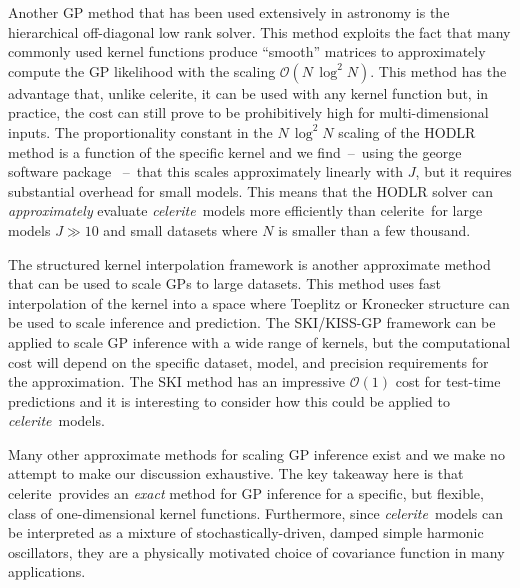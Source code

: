 \documentclass[manuscript, letterpaper]{aastex6}
\makeatletter
\let\origsection\section
\renewcommand\section{\@ifstar{\starsection}{\nostarsection}}
\newcommand\nostarsection[1]{\sectionprelude\origsection{#1}}
\newcommand\starsection[1]{\sectionprelude\origsection*{#1}}
\newcommand\sectionprelude{\vspace{1em}}
\newcommand{\project}[1]{\textsf{#1}}
\newcommand{\celerite}{\project{celerite}}
\newcommand{\celeriteterm}{\emph{celerite}}
\makeatother
\begin{document}
Another GP method that has been used extensively in astronomy is the
hierarchical off-diagonal low rank \citep[HODLR,][]{Ambikasaran:2016} solver.
This method exploits the fact that many commonly used kernel functions produce
``smooth'' matrices to approximately compute the GP likelihood with the
scaling $\mathcal{O}(N\,\log^2 N)$.
This method has the advantage that, unlike \celerite, it can be used with any
kernel function but, in practice, the cost can still prove to be prohibitively
high for multi-dimensional inputs.
The proportionality constant in the $N\,\log^2N$ scaling of the HODLR method
is a function of the specific kernel and we find~--~using the \project{george}
software package \citep{Foreman-Mackey:2014, Ambikasaran:2016}~--~that this
scales approximately linearly with $J$, but it requires substantial overhead
for small models.
This means that the HODLR solver can \emph{approximately} evaluate
\celeriteterm\
models more efficiently than \celerite\ for large models $J \gg 10$ and
small datasets where $N$ is smaller than a few thousand.

The structured kernel interpolation \citep[SKI/KISS-GP][]{Wilson:2015}
framework is another approximate method that can be used to scale GPs to large
datasets.
This method uses fast interpolation of the kernel into a space where Toeplitz
or Kronecker structure can be used to scale inference and prediction.
The SKI/KISS-GP framework can be applied to scale GP inference with a wide
range of kernels, but the computational cost will depend on the specific
dataset, model, and precision requirements for the approximation.
The SKI method has an impressive $\mathcal{O}(1)$ cost for test-time
predictions and it is interesting to consider how this could be applied to
\celeriteterm\ models.

Many other approximate methods for scaling GP inference exist \citep[see, for
example,][and references therein]{Wilson:2015a} and we make no attempt to make
our discussion exhaustive.
The key takeaway here is that \celerite\ provides an \emph{exact} method for
GP inference for a specific, but flexible, class of one-dimensional kernel
functions.
Furthermore, since \celeriteterm\ models can be interpreted as a mixture of
stochastically-driven, damped simple harmonic oscillators, they are a
physically motivated choice of covariance function in many applications.

\section{Summary}
\end{document}
